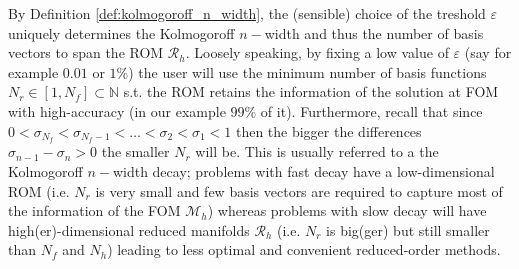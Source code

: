 \documentclass[../main.tex]{subfiles}
\begin{document}
By Definition \ref{def:kolmogoroff_n_width}, the (sensible) choice of the treshold $\varepsilon$ uniquely determines the Kolmogoroff $n-$width and thus the number of basis vectors to span the ROM $\mathcal{R}_{h}$. 
Loosely speaking, by fixing a low value of $\varepsilon$ (say for example $0.01$ or $1\%$) the user will use the minimum number of basis functions $N_{r}\in[1,N_{f}]\subset\mathbb{N}$ s.t. the ROM retains the information of the solution at FOM with high-accuracy (in our example $99\%$ of it).
Furthermore, recall that since $0<\sigma_{N_{f}}<\sigma_{N_{f}-1}<\dots<\sigma_{2}<\sigma_{1}<1$ then the bigger the differences $\sigma_{n-1}-\sigma_{n} > 0$ the smaller $N_{r}$ will be.
This is usually referred to a the Kolmogoroff $n-$width decay; problems with fast decay have a low-dimensional ROM (i.e. $N_{r}$ is very small and few basis vectors are required to capture most of the information of the FOM $\mathcal{M}_{h}$) whereas problems with slow decay will have high(er)-dimensional reduced manifolds $\mathcal{R}_{h}$ (i.e. $N_{r}$ is big(ger) but still smaller than $N_{f}$ and $N_{h}$) leading to less optimal and convenient reduced-order methods.
\end{document}
